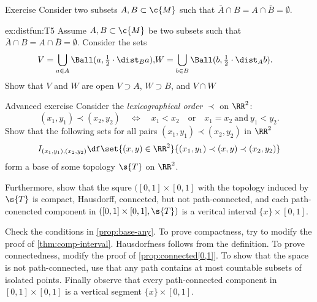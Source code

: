 \begin{thm}{Exercise}\label{ex:distfun}
Consider two subsets $A,B\subset \c{M}$ such that $\bar A\cap B=A\cap \bar B=\emptyset$.

\begin{subthm}{ex:distfun:T5}
Assume $A,B\subset \c{M}$ be two subsets such that $\bar A\cap B=A\cap \bar B=\emptyset$.
Consider the sets
\begin{align*}
V=\bigcup_{a\in A} \Ball(a,\tfrac12\cdot \dist_Ba),
&
W=\bigcup_{b\in B} \Ball(b,\tfrac12\cdot \dist_Ab).
\end{align*}
Show that $V$ and $W$ are open $V\supset A$, $W\supset B$, and $V\cap W$
\end{subthm}

\end{thm}



\begin{thm}{Advanced exercise}\label{ex:path-connected-component-closed-open:closed}
Consider the \emph{lexicographical order} $\prec$ on $\RR^2$:
\[
(x_1,y_1)\prec(x_2,y_2)
\quad\Leftrightarrow\quad
x_1<x_2\quad \text{or}\quad x_1=x_2\ \text{and}\  y_1<y_2.
\]
Show that the following sets for all pairs $(x_1,y_1)\prec(x_2,y_2)$ in $\RR^2$
\[I_{(x_1,y_1),(x_2,y_2)}\df\set{(x,y)\in \RR^2}{(x_1,y_1)\prec(x,y)\prec(x_2,y_2)}\]
form a base of some topology $\s{T}$ on $\RR^2$.

Furthermore, show that the squre $([0,1]\times[0,1]$ with the topology induced by $\s{T}$ is compact, Hausdorff, connected, but not path-connected, and each path-conencted component in $([0,1]\times[0,1],\s{T})$ is a veritcal interval $\{x\}\times[0,1]$.
\end{thm}


Check the conditions in \ref{prop:base-any}.
To prove compactness, try to modify the proof of \ref{thm:comp-interval}.
Hausdorfness follows from the definition.
To prove connectedness, modify the proof of \ref{prop:connected[0,1]}.
To show that the space is not path-connected, use that any path contains at most countable subsets of isolated points.
Finally observe that every path-connected component in $[0,1]\times[0,1]$ is a vertical segment $\{x\}\times [0,1]$.











